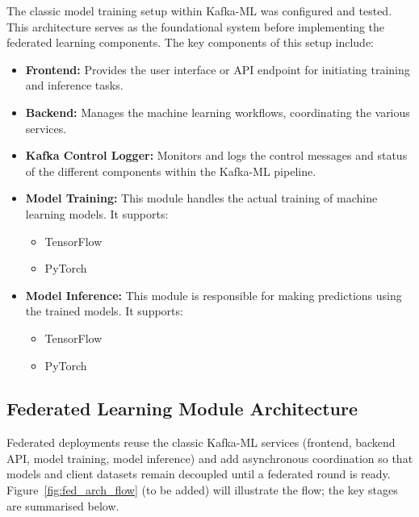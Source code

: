 The classic model training setup within Kafka-ML was configured and tested. This architecture serves as the foundational system before implementing the federated learning components. The key components of this setup include:

\begin{itemize}
    \item \textbf{Frontend:} Provides the user interface or API endpoint for initiating training and inference tasks.
    \item \textbf{Backend:} Manages the machine learning workflows, coordinating the various services.
    \item \textbf{Kafka Control Logger:} Monitors and logs the control messages and status of the different components within the Kafka-ML pipeline.
    \item \textbf{Model Training:} This module handles the actual training of machine learning models. It supports:
    \begin{itemize}
        \item TensorFlow
        \item PyTorch
    \end{itemize}
    \item \textbf{Model Inference:} This module is responsible for making predictions using the trained models. It supports:
    \begin{itemize}
        \item TensorFlow
        \item PyTorch
    \end{itemize}
\end{itemize}

\subsection{Federated Learning Module Architecture}
\label{subsec:federated_learning_module}

Federated deployments reuse the classic Kafka-ML services (frontend, backend API, model training, model inference) and add asynchronous coordination so that models and client datasets remain decoupled until a federated round is ready. Figure~\ref{fig:fed_arch_flow} (to be added) will illustrate the flow; the key stages are summarised below.

